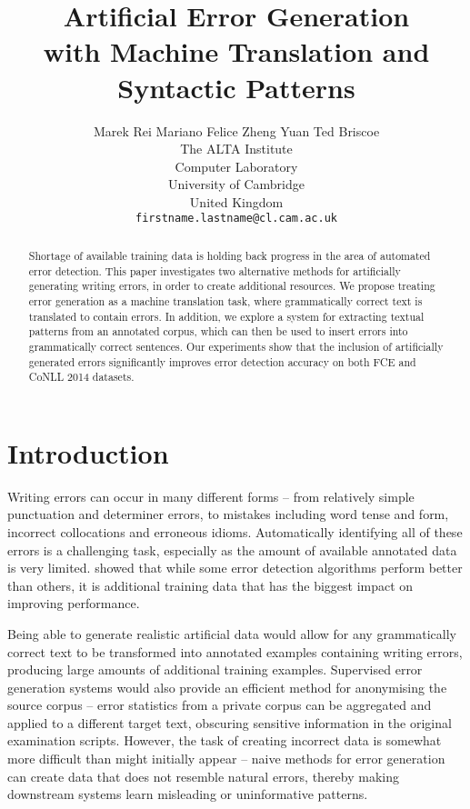 \documentclass[11pt,letterpaper]{article}
\title{Artificial Error Generation \\with Machine Translation and Syntactic Patterns}
\author{Marek Rei \hspace{1cm} Mariano Felice \hspace{1cm} Zheng Yuan \hspace{1cm} Ted Briscoe\\
	    The ALTA Institute\\
	    Computer Laboratory\\
	    University of Cambridge\\
        United Kingdom\\
	    {\tt firstname.lastname@cl.cam.ac.uk} \\}
\date{}
\begin{document}
\maketitle

\begin{abstract}
Shortage of available training data is holding back progress in the area of automated error detection.
This paper investigates two alternative methods for artificially generating writing errors, in order to create additional resources.
We propose treating error generation as a machine translation task, where grammatically correct text is translated to contain errors.
In addition, we explore a system for extracting textual patterns from an annotated corpus, which can then be used to insert errors into grammatically correct sentences.
Our experiments show that the inclusion of artificially generated errors significantly improves error detection accuracy on both FCE and CoNLL 2014 datasets.
\end{abstract}



\section{Introduction}
Writing errors can occur in many different forms -- from relatively simple punctuation and determiner errors, to mistakes including word tense and form, incorrect collocations and erroneous idioms. Automatically identifying all of these errors is a challenging task, especially as the amount of available annotated data is very limited. 
 showed that while some error detection algorithms perform better than others, it is additional training data that has the biggest impact on improving performance.

Being able to generate realistic artificial data would allow for any grammatically correct text to be transformed into annotated examples containing writing errors, producing large amounts of additional training examples.
Supervised error generation systems would also provide an efficient method for anonymising the source corpus -- error statistics from a private corpus can be aggregated and applied to a different target text, obscuring sensitive information in the original examination scripts.
However, the task of creating incorrect data is somewhat more difficult than might initially appear -- naive methods for error generation can create data that does not resemble natural errors, thereby making downstream systems learn misleading or uninformative patterns.
\end{document}
